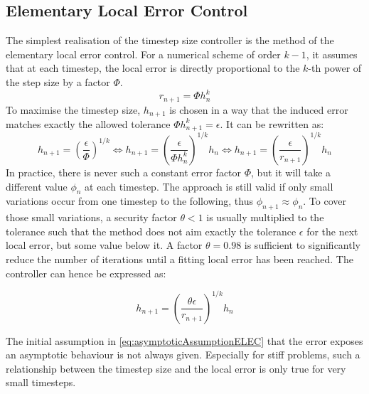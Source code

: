 \documentclass{report}
\begin{document}
\subsection{Elementary Local Error Control}
The simplest realisation of the timestep size controller is the method of the elementary local error control. For a numerical scheme of order $k-1$, it assumes that at each timestep, the local error is directly proportional to the $k$-th power of the step size by a factor $\Phi$. 
\begin{equation}
    \label{eq:asymptoticAssumptionELEC}
    r_{n+1} = \Phi h_n^k 
\end{equation}
To maximise the timestep size, $h_{n+1}$ is chosen in a way that the induced error matches exactly the allowed tolerance $\Phi h_{n+1}^k = \epsilon$. It can be rewritten as:
\begin{equation}
    h_{n+1} = \left(\frac{\epsilon}{\Phi}\right)^{1/k}
    \Leftrightarrow 
    h_{n+1} = \left(\frac{\epsilon}{\Phi h_n^k}\right)^{1/k}h_n
    \Leftrightarrow
    h_{n+1} = \left(\frac{\epsilon}{r_{n+1}}\right)^{1/k}h_n
\end{equation}
In practice, there is never such a constant error factor $\Phi$, but it will take a different value $\phi_n$ at each timestep. The approach is still valid if only small variations occur from one timestep to the following, thus $\phi_{n+1} \approx \phi_n$. To cover those small variations, a security factor $\theta < 1$ is usually multiplied to the tolerance such that the method does not aim exactly the tolerance $\epsilon$ for the next local error, but some value below it. A factor $\theta=0.98$ is sufficient to significantly reduce the number of iterations until a fitting local error has been reached. The controller can hence be expressed as:

\begin{equation}
    \label{eq:ELEController}
    h_{n+1} = \left(\frac{\theta\epsilon}{r_{n+1}}\right)^{1/k}h_n
\end{equation}

The initial assumption in \autoref{eq:asymptoticAssumptionELEC} that the error exposes an asymptotic behaviour is not always given. Especially for stiff problems, such a relationship between the timestep size and the local error is only true for very small timesteps. 
\end{document}
